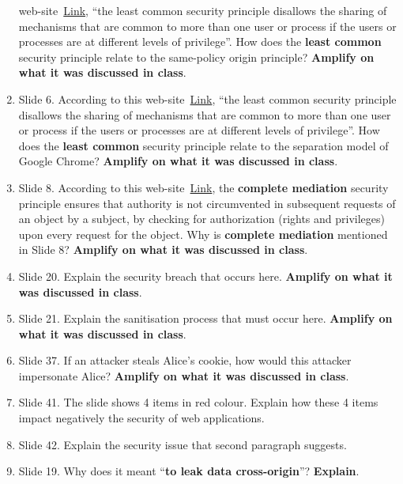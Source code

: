 \documentclass{article}
\begin{document}
\begin{enumerate}
  web-site~\href{https://owasp.org/www-project-developer-guide/draft/foundations/security_principles}{Link},
  ``the least common security principle disallows the sharing of
  mechanisms that are common to more than one user or process if the
  users or processes are at different levels of privilege''. How does
  the \textbf{least common} security principle relate to the same-policy origin
  principle? \textbf{Amplify on what it was discussed in class}.
%
\item Slide 6. According to this
  web-site~\href{https://owasp.org/www-project-developer-guide/draft/foundations/security_principles}{Link},
  ``the least common security principle disallows the sharing of
  mechanisms that are common to more than one user or process if the
  users or processes are at different levels of privilege''. How does
  the \textbf{least common} security principle relate to the separation model
  of Google Chrome? \textbf{Amplify on what it was discussed in class}.
%
\item Slide 8. According to this
  web-site~\href{https://owasp.org/www-project-developer-guide/draft/foundations/security_principles}{Link},
  the \textbf{complete mediation} security principle ensures that
  authority is not circumvented in subsequent requests of an object by
  a subject, by checking for authorization (rights and privileges)
  upon every request for the object. Why is \textbf{complete
    mediation} mentioned in Slide 8? \textbf{Amplify on what it was discussed in class}.
\item Slide 20. Explain the security breach that occurs 
  here.  \textbf{Amplify on what it was discussed in class}.
\item Slide 21. Explain the sanitisation process that must occur here.
  \textbf{Amplify on what it was discussed in class}.
\item Slide 37. If an attacker steals Alice's cookie, how would this
  attacker impersonate Alice?  \textbf{Amplify on what it was
    discussed in class}.
\item Slide 41. The slide shows 4 items in red colour. Explain how
  these 4 items impact negatively the security of web applications.
\item Slide 42. Explain the security issue that second paragraph
  suggests.  
\item Slide 19. Why does it meant ``\textbf{to leak data
    cross-origin}''? \textbf{Explain}.  
\end{enumerate}  
\end{document}
